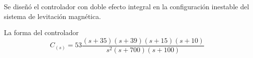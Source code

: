 Se diseñó el controlador con doble efecto integral en la configuración inestable del sistema de levitación magnética. 

La forma del controlador 
\[
C_{(s)} = 53\frac{(s+35)(s+39)(s+15)(s+10)}{s^2(s+700)(s+100)}
\]


    
    







